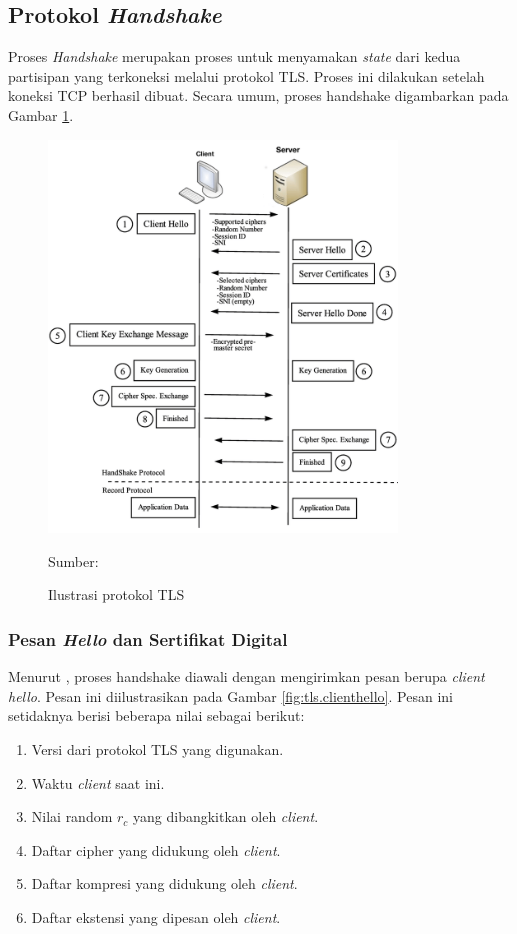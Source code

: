 \subsection{Protokol \emph{Handshake}}
\label{sec:tls.handshake}

Proses \emph{Handshake} merupakan proses untuk menyamakan \emph{state} dari kedua partisipan yang terkoneksi melalui protokol TLS. Proses ini dilakukan setelah koneksi TCP berhasil dibuat. Secara umum, proses handshake
digambarkan pada Gambar \ref{fig:tls.handshake}.

\begin{figure}[!h]
  \centering
  \includegraphics[width=350px]{chapters/res/chapter-2/img/tls.protocol.png}
  \caption{Ilustrasi protokol TLS} \label{fig:tls.handshake}
  Sumber: \textcite{shbair2016}
\end{figure}

\subsubsection{Pesan \emph{Hello} dan Sertifikat Digital}
Menurut \textcite{rfc5246}, proses handshake diawali dengan mengirimkan pesan berupa \emph{client hello}. Pesan ini diilustrasikan pada Gambar \ref{fig:tls.clienthello}. Pesan ini setidaknya berisi beberapa nilai sebagai berikut:
\begin{enumerate}
  \item Versi dari protokol TLS yang digunakan.
  \item Waktu \emph{client} saat ini.
  \item Nilai random $r_c$ yang dibangkitkan oleh \emph{client}.
  \item Daftar cipher yang didukung oleh \emph{client}.
  \item Daftar kompresi yang didukung oleh \emph{client}.
  \item Daftar ekstensi yang dipesan oleh \emph{client}.
\end{enumerate}

